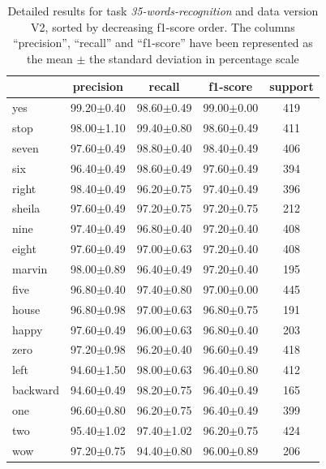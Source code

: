 \documentclass[review]{elsarticle}
\begin{document}
\begin{table} \centering \scriptsize
	\caption{Detailed results for task \textit{35-words-recognition} and data version V2, sorted by decreasing f1-score order. The columns ``precision'', ``recall'' and ``f1-score'' have been represented as the mean $\pm$ the standard deviation in percentage scale }
	\begin{tabular}{lcccc}
		\toprule
		{} &       precision &          recall &        f1-score & support \\
		\midrule
		yes       &  99.20$\pm$0.40 &  98.60$\pm$0.49 &  99.00$\pm$0.00 &     419 \\
		stop      &  98.00$\pm$1.10 &  99.40$\pm$0.80 &  98.60$\pm$0.49 &     411 \\
		seven     &  97.60$\pm$0.49 &  98.80$\pm$0.40 &  98.40$\pm$0.49 &     406 \\
		six       &  96.40$\pm$0.49 &  98.60$\pm$0.49 &  97.60$\pm$0.49 &     394 \\
		right     &  98.40$\pm$0.49 &  96.20$\pm$0.75 &  97.40$\pm$0.49 &     396 \\
		sheila    &  97.60$\pm$0.49 &  97.20$\pm$0.75 &  97.20$\pm$0.75 &     212 \\
		nine      &  97.40$\pm$0.49 &  96.80$\pm$0.40 &  97.20$\pm$0.40 &     408 \\
		eight     &  97.60$\pm$0.49 &  97.00$\pm$0.63 &  97.20$\pm$0.40 &     408 \\
		marvin    &  98.00$\pm$0.89 &  96.40$\pm$0.49 &  97.20$\pm$0.40 &     195 \\
		five      &  96.80$\pm$0.40 &  97.40$\pm$0.80 &  97.00$\pm$0.00 &     445 \\
		house     &  96.80$\pm$0.98 &  97.00$\pm$0.63 &  96.80$\pm$0.75 &     191 \\
		happy     &  97.60$\pm$0.49 &  96.00$\pm$0.63 &  96.80$\pm$0.40 &     203 \\
		zero      &  97.20$\pm$0.98 &  96.20$\pm$0.40 &  96.60$\pm$0.49 &     418 \\
		left      &  94.60$\pm$1.50 &  98.00$\pm$0.63 &  96.40$\pm$0.80 &     412 \\
		backward  &  94.60$\pm$0.49 &  98.20$\pm$0.75 &  96.40$\pm$0.49 &     165 \\
		one       &  96.60$\pm$0.80 &  96.20$\pm$0.75 &  96.40$\pm$0.49 &     399 \\
		two       &  95.40$\pm$1.02 &  97.40$\pm$1.02 &  96.20$\pm$0.75 &     424 \\
		wow       &  97.20$\pm$0.75 &  94.40$\pm$0.80 &  96.00$\pm$0.89 &     206 \\

\end{tabular}
\end{table}
\end{document}
